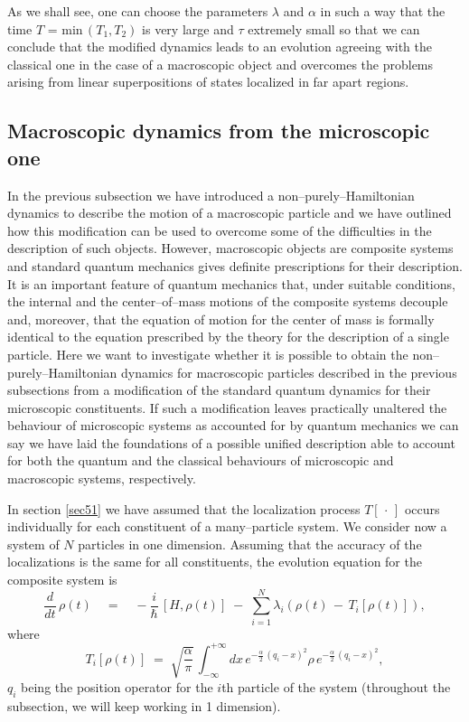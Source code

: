 \documentclass[12pt]{article}
\begin{document}
As we shall see, one can choose the parameters $\lambda$ and
$\alpha$ in such a way that the time $T$ = min$\,(T_{1}, T_{2})$
is very large and $\tau$ extremely small so that we can conclude
that the modified dynamics leads to an evolution agreeing with the
classical one in the case of a macroscopic object and overcomes
the problems arising from linear superpositions of states
localized in far apart regions.


\subsection{Macroscopic dynamics from the microscopic one}
\label{sec54}

In the previous subsection we have introduced a
non--purely--Hamiltonian dynamics to describe the motion of a
macroscopic particle and we have outlined how this modification
can be used to overcome some of the difficulties  in the
description of such objects. However, macroscopic objects are
composite systems and standard quantum mechanics gives definite
prescriptions for their description. It is an important feature of
quantum mechanics that, under suitable conditions, the internal
and the center--of--mass  motions of the composite systems
decouple and, moreover, that the equation of motion for the center
of mass is formally identical to the equation prescribed by the
theory for the description of a single particle. Here we want to
investigate whether it is possible to obtain the
non--purely--Hamiltonian dynamics for macroscopic particles
described in the previous subsections from a modification of the
standard quantum dynamics for their microscopic constituents. If
such a modification leaves practically unaltered the behaviour of
microscopic systems as accounted for by quantum mechanics we can
say we have laid the foundations of a possible unified description
able to account for both the quantum and the classical behaviours
of  microscopic and macroscopic systems, respectively.

In section \ref{sec51} we have assumed that the localization
process $T[\,\cdot\,]$ occurs individually for each constituent of
a many--particle system. We consider now a system of $N$ particles
in one dimension. Assuming that the accuracy of the localizations
is the same for all constituents, the evolution equation for the
composite system is
\begin{equation} \label{pclm}
\frac{d}{dt}\, \rho(t) \quad = \quad -\frac{i}{\hbar}\, [H,
\rho(t)] \; - \; \sum_{i=1}^{N} \lambda_{i} \left( \rho(t) \, - \,
T_{i}[\rho(t)]\right),
\end{equation}
where
\begin{equation} \label{nhdn}
T_{i}[\rho(t)] \; = \; \sqrt{\frac{\alpha}{\pi}}\,
\int_{-\infty}^{+\infty} dx\, e^{\displaystyle -
\frac{\alpha}{2}\, (q_{i} - x)^{2}} \rho\, e^{\displaystyle -
\frac{\alpha}{2}\, (q_{i} - x)^{2}},
\end{equation}
$q_{i}$ being the position operator for the $i$th particle of the
system (throughout the subsection, we will keep working in 1
dimension).
\end{document}
